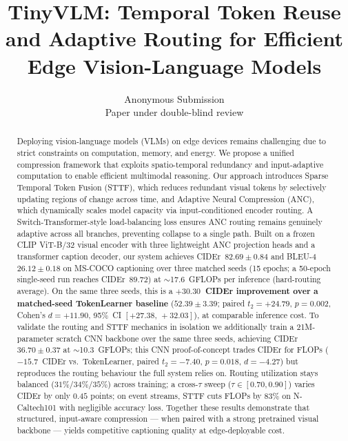 \documentclass{article}
\title{TinyVLM: Temporal Token Reuse and Adaptive Routing for Efficient Edge Vision-Language Models}
\author{%
  Anonymous Submission \\
  Paper under double-blind review \\
}
\begin{document}
\maketitle


\begin{abstract}
Deploying vision-language models (VLMs) on edge devices remains challenging due to strict constraints on computation, memory, and energy. We propose a unified compression framework that exploits spatio-temporal redundancy and input-adaptive computation to enable efficient multimodal reasoning. Our approach introduces Sparse Temporal Token Fusion (STTF), which reduces redundant visual tokens by selectively updating regions of change across time, and Adaptive Neural Compression (ANC), which dynamically scales model capacity via input-conditioned encoder routing. A Switch-Transformer-style load-balancing loss ensures ANC routing remains genuinely adaptive across all branches, preventing collapse to a single path. Built on a frozen CLIP ViT-B/32 visual encoder with three lightweight ANC projection heads and a transformer caption decoder, our system achieves CIDEr~$\mathbf{82.69 \pm 0.84}$ and BLEU-4~$\mathbf{26.12 \pm 0.18}$ on MS-COCO captioning over three matched seeds (15 epochs; a 50-epoch single-seed run reaches CIDEr~$89.72$) at $\sim$17.6~GFLOPs per inference (hard-routing average). On the same three seeds, this is a \textbf{$+30.30$~CIDEr improvement over a matched-seed TokenLearner baseline} ($52.39 \pm 3.39$; paired $t_{2}{=}{+}24.79$, $p{=}0.002$, Cohen's $d{=}{+}11.90$, 95\%~CI $[{+}27.38,\,{+}32.03]$), at comparable inference cost. To validate the routing and STTF mechanics in isolation we additionally train a 21M-parameter scratch CNN backbone over the same three seeds, achieving CIDEr~$36.70 \pm 0.37$ at $\sim$10.3~GFLOPs; this CNN proof-of-concept trades CIDEr for FLOPs ($-15.7$~CIDEr vs.\ TokenLearner, paired $t_{2}{=}{-}7.40$, $p{=}0.018$, $d{=}{-}4.27$) but reproduces the routing behaviour the full system relies on. Routing utilization stays balanced ($31\%$/$34\%$/$35\%$) across training; a cross-$\tau$ sweep ($\tau \in [0.70, 0.90]$) varies CIDEr by only $0.45$ points; on event streams, STTF cuts FLOPs by $83\%$ on N-Caltech101 with negligible accuracy loss. Together these results demonstrate that structured, input-aware compression --- when paired with a strong pretrained visual backbone --- yields competitive captioning quality at edge-deployable cost.
\end{abstract}
\end{document}
